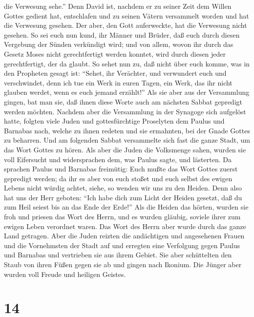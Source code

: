 die Verwesung sehe.''  Denn David ist, nachdem er zu
seiner Zeit dem Willen Gottes gedient hat, entschlafen und zu seinen
Vätern versammelt worden und hat die Verwesung gesehen. 
Der aber, den Gott auferweckte, hat die Verwesung nicht gesehen.
 So sei euch nun kund, ihr Männer und Brüder, daß euch
durch diesen Vergebung der Sünden verkündigt wird;  und
von allem, wovon ihr durch das Gesetz Moses nicht gerechtfertigt werden
konntet, wird durch diesen jeder gerechtfertigt, der da glaubt.
 So sehet nun zu, daß nicht über euch komme, was in den
Propheten gesagt ist:  ``Sehet, ihr Verächter, und
verwundert euch und verschwindet, denn ich tue ein Werk in euren Tagen,
ein Werk, das ihr nicht glauben werdet, wenn es euch jemand erzählt!''
 Als sie aber aus der Versammlung gingen, bat man sie,
daß ihnen diese Worte auch am nächsten Sabbat gepredigt werden möchten.
 Nachdem aber die Versammlung in der Synagoge sich
aufgelöst hatte, folgten viele Juden und gottesfürchtige Proselyten dem
Paulus und Barnabas nach, welche zu ihnen redeten und sie ermahnten, bei
der Gnade Gottes zu beharren.  Und am folgenden Sabbat
versammelte sich fast die ganze Stadt, um das Wort Gottes zu hören.
 Als aber die Juden die Volksmenge sahen, wurden sie voll
Eifersucht und widersprachen dem, was Paulus sagte, und lästerten.
 Da sprachen Paulus und Barnabas freimütig: Euch mußte
das Wort Gottes zuerst gepredigt werden; da ihr es aber von euch stoßet
und euch selbst des ewigen Lebens nicht würdig achtet, siehe, so wenden
wir uns zu den Heiden.  Denn also hat uns der Herr
geboten: ``Ich habe dich zum Licht der Heiden gesetzt, daß du zum Heil
seiest bis an das Ende der Erde!''  Als die Heiden das
hörten, wurden sie froh und priesen das Wort des Herrn, und es wurden
gläubig, soviele ihrer zum ewigen Leben verordnet waren. 
Das Wort des Herrn aber wurde durch das ganze Land getragen.
 Aber die Juden reizten die andächtigen und angesehenen
Frauen und die Vornehmsten der Stadt auf und erregten eine Verfolgung
gegen Paulus und Barnabas und vertrieben sie aus ihrem Gebiet.
 Sie aber schüttelten den Staub von ihren Füßen gegen sie
ab und gingen nach Ikonium.  Die Jünger aber wurden voll
Freude und heiligen Geistes.

\hypertarget{section-13}{%
\section{14}\label{section-13}}

